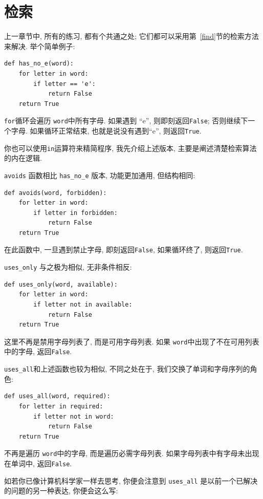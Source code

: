 \documentclass[10pt]{book}
\begin{document}
\section{检索}
\label{search}

上一章节中, 所有的练习, 都有个共通之处;
它们都可以采用第~\ref{find}节的检索方法来解决. 
举个简单例子:

\begin{verbatim}
def has_no_e(word):
    for letter in word:
        if letter == 'e':
            return False
    return True
\end{verbatim}
%
{\tt for}循环会遍历 {\tt word}中所有字母. 
如果遇到 ``e'', 则即刻返回{\tt False};
否则继续下一个字母. 
如果循环正常结束, 也就是说没有遇到``e'',  则返回{\tt True}.

你也可以使用{\tt in}运算符来精简程序, 
我先介绍上述版本, 主要是阐述清楚检索算法的内在逻辑. 

{\tt avoids} 函数相比 \verb"has_no_e" 版本, 功能更加通用, 
但结构相同:

\begin{verbatim}
def avoids(word, forbidden):
    for letter in word:
        if letter in forbidden:
            return False
    return True
\end{verbatim}
%
在此函数中, 一旦遇到禁止字母, 即刻返回{\tt False}, 
如果循环终了, 则返回{\tt True}. 

\verb"uses_only" 与之极为相似, 无非条件相反:

\begin{verbatim}
def uses_only(word, available):
    for letter in word: 
        if letter not in available:
            return False
    return True
\end{verbatim}
%
这里不再是禁用字母列表了, 而是可用字母列表. 
如果 {\tt word}中出现了不在可用列表中的字母, 返回{\tt False}.

\verb"uses_all"和上述函数也较为相似, 不同之处在于, 
我们交换了单词和字母序列的角色:

\begin{verbatim}
def uses_all(word, required):
    for letter in required: 
        if letter not in word:
            return False
    return True
\end{verbatim}
%
不再是遍历 {\tt word}中的字母, 
而是遍历必需字母列表. 
如果字母列表中有字母未出现在单词中, 返回{\tt False}.

如若你已像计算机科学家一样去思考, 你便会注意到 \verb"uses_all" 
是以前一个已解决的问题的另一种表达, 你便会这么写:
\end{document}
